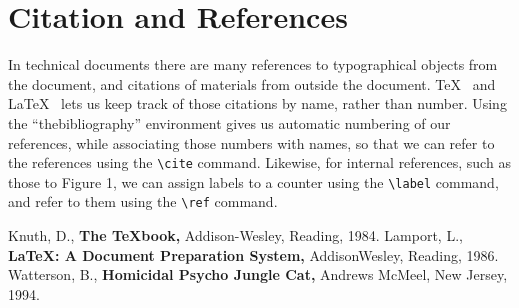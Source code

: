 \documentclass[a4paper,12pt]{extarticle}
\begin{document}
\section{Citation and References}
In technical documents there are many references to typographical objects
from the document, and citations of materials from outside the document.
\TeX\ \cite{Knuth} and \LaTeX\ \cite{Lamport} lets us keep track of those citations by name, rather
than number. Using the ``thebibliography'' environment gives us automatic numbering of our references, while associating those numbers with names,
so that we can refer to the references using the \verb|\cite| command. Likewise,
for internal references, such as those to Figure 1, we can assign labels to
a counter using the \verb|\label| command, and refer to them using the \verb|\ref|
command.

\begin{thebibliography}{}
 Knuth, D., \textbf{The \TeX book,} Addison-Wesley, Reading, 1984.
 Lamport, L., \textbf{\LaTeX : A Document Preparation System,} AddisonWesley, Reading, 1986.
 Watterson, B., \textbf{Homicidal Psycho Jungle Cat,} Andrews McMeel,
New Jersey, 1994.
\end{thebibliography}
\end{document}
